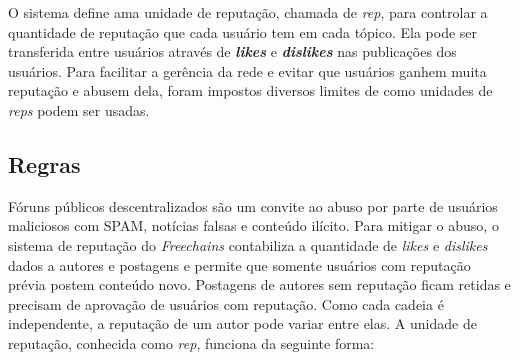 \documentclass[12pt]{article}
\newcommand{\FC} {\emph{Freechains}\xspace}
\begin{document}
O sistema define ama unidade de reputação, chamada de \emph{rep}, para controlar a quantidade de reputação que cada usuário tem em cada tópico.  
Ela pode ser transferida entre usuários através de \textbf{\emph{likes}} e \textbf{\emph{dislikes}} nas publicações dos usuários.  
Para facilitar a gerência da rede e evitar que usuários ganhem muita reputação e abusem dela, foram impostos diversos limites de como unidades de \emph{reps} podem ser usadas. 


\subsection{Regras} \label{subsec:regras}


Fóruns públicos descentralizados são um convite ao abuso por parte de usuários maliciosos com SPAM, notícias falsas e conteúdo ilícito.
Para mitigar o abuso, o sistema de reputação do \FC contabiliza a quantidade de \emph{likes} e \emph{dislikes} dados a autores e postagens e permite que somente usuários com reputação prévia postem conteúdo novo.
Postagens de autores sem reputação ficam retidas e precisam de aprovação de usuários com reputação.
Como cada cadeia é independente, a reputação de um autor pode variar entre elas.
A unidade de reputação, conhecida como \emph{rep}, funciona da seguinte forma:
\end{document}

